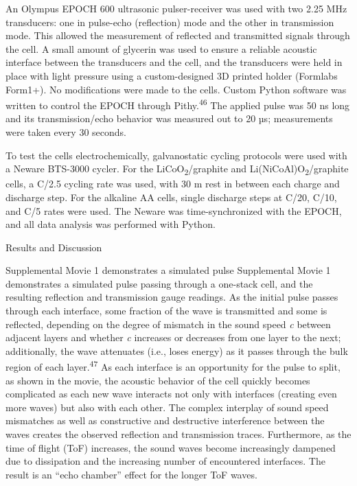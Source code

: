 \documentclass[]{article}
\begin{document}
{ }An Olympus EPOCH 600 ultrasonic pulser-receiver was used with two
2.25 MHz transducers: one in pulse-echo (reflection) mode and the other
in transmission mode. This allowed the measurement of reflected and
transmitted signals through the cell. A small amount of glycerin was
used to ensure a reliable acoustic interface between the transducers and
the cell, and the transducers were held in place with light pressure
using a custom-designed 3D printed holder (Formlabs Form1+). No
modifications were made to the cells. Custom Python software was written
to control the EPOCH through Pithy.\textsuperscript{46} The applied
pulse was 50 ns long and its transmission/echo behavior was measured out
to 20 µs; measurements were taken every 30 seconds.

{ }To test the cells electrochemically, galvanostatic cycling protocols
were used with a Neware BTS-3000 cycler. For the
LiCoO\textsubscript{2}/graphite and
Li(NiCoAl)O\textsubscript{2}/graphite cells, a C/2.5 cycling rate was
used, with 30 m rest in between each charge and discharge step. For the
alkaline AA cells, single discharge steps at C/20, C/10, and C/5 rates
were used. The Neware was time-synchronized with the EPOCH, and all data
analysis was performed with Python.

Results and Discussion

{ }Supplemental Movie 1 demonstrates a simulated pulse Supplemental
Movie 1 demonstrates a simulated pulse passing through a one-stack cell,
and the resulting reflection and transmission gauge readings. As the
initial pulse passes through each interface, some fraction of the wave
is transmitted and some is reflected, depending on the degree of
mismatch in the sound speed \emph{c} between adjacent layers and whether
\emph{c} increases or decreases from one layer to the next;
additionally, the wave attenuates (i.e., loses energy) as it passes
through the bulk region of each layer.\textsuperscript{47} As each
interface is an opportunity for the pulse to split, as shown in the
movie, the acoustic behavior of the cell quickly becomes complicated as
each new wave interacts not only with interfaces (creating even more
waves) but also with each other. The complex interplay of sound speed
mismatches as well as constructive and destructive interference between
the waves creates the observed reflection and transmission traces.
Furthermore, as the time of flight (ToF) increases, the sound waves
become increasingly dampened due to dissipation and the increasing
number of encountered interfaces. The result is an ``echo chamber''
effect for the longer ToF waves.
\end{document}
